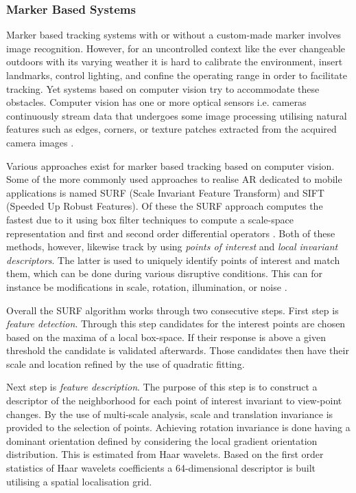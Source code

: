 \subsubsection{Marker Based Systems}
Marker based tracking systems with or without a custom-made marker involves image recognition. However, for an uncontrolled context like the ever changeable outdoors with its varying weather it is hard to calibrate the environment, insert landmarks, control lighting, and confine the operating range in order to facilitate tracking. Yet systems based on computer vision try to accommodate these obstacles. Computer vision has one or more optical sensors i.e. cameras continuously stream data that undergoes some image processing utilising natural features such as edges, corners, or texture patches extracted from the acquired camera images \cite{Barandiaram2010} \cite{Maidi2011}. 

Various approaches exist for marker based tracking based on computer vision. Some of the more commonly used approaches to realise AR dedicated to mobile applications is named SURF (Scale Invariant Feature Transform) and SIFT (Speeded Up Robust Features). Of these the SURF approach computes the fastest due to it using box filter techniques to compute a scale-space representation and first and second order differential operators \cite{Oyallon2015}. Both of these methods, however, likewise track by using \textit{points of interest} and \textit{local invariant descriptors}. The latter is used to uniquely identify points of interest and match them, which can be done during various disruptive conditions. This can for instance be modifications in scale, rotation, illumination, or noise \cite{Maidi2011}.

Overall  the SURF algorithm works through two consecutive steps. First step is \textit{feature detection}. Through this step candidates for the interest points are chosen based on the maxima of a local box-space. If their response is above a given threshold the candidate is validated afterwards. Those candidates then have their scale and location refined by the use of quadratic fitting. \cite{Oyallon2015} 

Next step is \textit{feature description}. The purpose of this step is to construct a descriptor of the neighborhood for each point of interest invariant to view-point changes. By the use of multi-scale analysis, scale and translation invariance is provided to the selection of points. Achieving rotation invariance is  done having a dominant orientation defined by considering the local gradient orientation distribution. This is estimated from Haar wavelets. Based on the first order statistics of Haar wavelets coefficients a 64-dimensional descriptor is built utilising a spatial localisation grid. \cite{Oyallon2015} 

